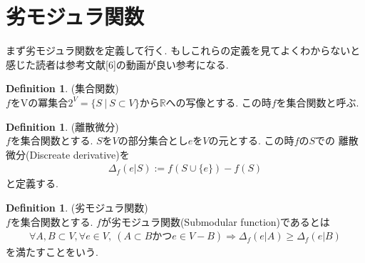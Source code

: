 \documentclass[11pt, a4paper, dvipdfmx]{jsarticle}
\theoremstyle{definition}
\newtheorem{Definition+}[Axiom+]{Definition}
\newcommand{\R}{\mathbb{R}}
\begin{document}
\section{劣モジュラ関数}
まず劣モジュラ関数を定義して行く. もしこれらの定義を見てよくわからないと感じた読者は参考文献[6]の動画が良い参考になる.
\begin{Definition+}(集合関数)\\
   $f$をVの冪集合$2^{V} = \{S~|~S\subset V\}$から$\R$への写像とする. この時$f$を集合関数と呼ぶ.
\end{Definition+}
\begin{Definition+}(離散微分)\\
    $f$を集合関数とする. $S$を$V$の部分集合とし$e$を$V$の元とする. この時$f$の$S$での
    離散微分(Discreate derivative)を
    \begin{align*}
        \Delta_{f}(e | S) := f(S\cup\{e\}) - f(S)
    \end{align*}
    と定義する.
\end{Definition+}
\begin{Definition+}(劣モジュラ関数)\\
    $f$を集合関数とする. $f$が劣モジュラ関数(Submodular function)であるとは
    \begin{align*}
        \forall A, B\subset V, \forall e\in V, ~(A\subset B かつe\in V - B)\Longrightarrow \Delta_{f}(e | A)\geq\Delta_{f}(e | B)
    \end{align*}
    を満たすことをいう.
\end{Definition+}
\end{document}
